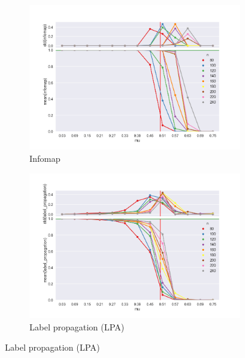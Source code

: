 \begin{figure}
    \begin{subfigure}[b]{0.32\textwidth}
        \includegraphics[width=\textwidth]{fig/nmi_vs_mu_infomap}
        \caption{Infomap}
        \label{fig:mouse}
    \end{subfigure}
    \qquad
    \begin{subfigure}[b]{0.32\textwidth}
        \includegraphics[width=\textwidth]{fig/nmi_vs_mu_label_propagation}
        \caption{Label propagation (LPA)}
        \label{fig:gull}
    \end{subfigure}
      

\end{figure}
